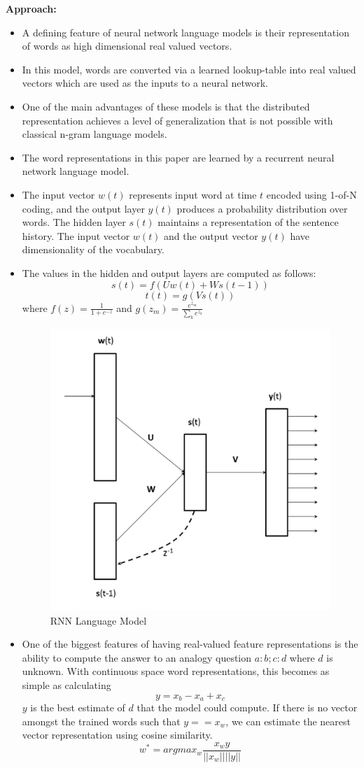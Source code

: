 \documentclass[11pt,a4paper]{article}
\begin{document}
  \textbf{Approach:}
  \begin{itemize}
    \item 
    A defining feature of neural network language models is their representation of words as high dimensional real valued vectors.
    \item 
    In this model, words are converted via a learned lookup-table into real valued vectors which are used as the inputs to a neural network.
    \item 
    One of the main advantages of these models is that the distributed representation achieves a level of generalization that is not possible with classical n-gram language models.
    \item 
    The word representations in this paper are learned by a recurrent neural network language model.
    \item 
    The input vector $w(t)$ represents input word at time $t$ encoded using 1-of-N coding, and the output layer $y(t)$ produces a probability distribution over words. The hidden layer $s(t)$ maintains a representation of the sentence history. The input vector $w(t)$ and the output vector $y(t)$ have dimensionality of the vocabulary.
    \item 
    The values in the hidden and output layers are computed as follows:
    $$s(t) = f(Uw(t) + Ws(t-1))$$
    $$t(t) = g(Vs(t))$$
    where
    $f(z) = \frac{1}{1 + e^{-z}}$ and $g(z_m) = \frac{e^{z_m}}{\sum_k e^{z_k}} $
    \begin{figure}[ht]
      \centering
      \includegraphics[width=.4\textwidth]{rnn-lang-model.png}
      \caption{RNN Language Model}
      \label{fig:rnn-lang-model}
    \end{figure}
    \item 
    One of the biggest features of having real-valued feature representations is the ability to compute the answer to an analogy question $a:b; c:d$ where $d$ is unknown. With continuous space word representations, this becomes as simple as calculating 
    $$y = x_b - x_a + x_c$$
    $y$ is the best estimate of $d$ that the model could compute. If there is no vector amongst the trained words such that $y == x_w$, we can estimate the nearest vector representation using cosine similarity.
    $$w^* = argmax_w \frac{x_w y}{||x_w|| ||y||}$$
  \end{itemize}
\end{document}

